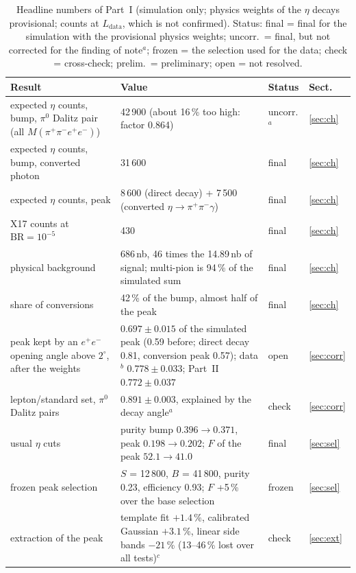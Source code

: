\documentclass[11pt,a4paper]{article}
\newcommand{\piz}{\ensuremath{\pi^{0}}\xspace}
\newcommand{\ee}{\ensuremath{e^{+}e^{-}}\xspace}
\newcommand{\pipi}{\ensuremath{\pi^{+}\pi^{-}}\xspace}
\newcommand{\Mfour}{\ensuremath{M(\pi^{+}\pi^{-}e^{+}e^{-})}\xspace}
\newcommand{\Ldata}{\ensuremath{L_{\mathrm{data}}}\xspace}
\begin{document}
\begin{table}[H]
\centering
\caption{Headline numbers of Part~I (simulation only; physics weights of the $\eta$ decays provisional; counts at
$\Ldata$, which is not confirmed). Status: final = final for the simulation with the provisional physics weights;
uncorr.\ = final, but not corrected for the finding of note$^{a}$; frozen = the selection used for the data;
check = cross-check; prelim.\ = preliminary; open = not resolved.}
\label{tab:sum}
\small
\setlength{\tabcolsep}{4pt}
\begin{tabularx}{\textwidth}{@{}>{\raggedright\arraybackslash}p{4.5cm} L >{\raggedright\arraybackslash}p{1.35cm} >{\raggedright\arraybackslash}p{0.8cm}@{}}
\toprule
Result & Value & Status & Sect. \\
\midrule
expected $\eta$ counts, bump, \piz Dalitz pair (all \Mfour) & 42\,900 (about 16\,\% too high: factor 0.864) & uncorr.$^{a}$ & \ref{sec:ch} \\
expected $\eta$ counts, bump, converted photon & 31\,600 & final & \ref{sec:ch} \\
expected $\eta$ counts, peak & 8\,600 (direct decay) + 7\,500 (converted $\eta\to\pipi\gamma$) & final & \ref{sec:ch} \\
X17 counts at $\mathrm{BR}=10^{-5}$ & 430 & final & \ref{sec:ch} \\
physical background & 686\,nb, 46 times the 14.89\,nb of signal; multi-pion is 94\,\% of the simulated sum & final & \ref{sec:ch} \\
share of conversions & 42\,\% of the bump, almost half of the peak & final & \ref{sec:ch} \\
peak kept by an \ee opening angle above $2^\circ$, after the weights & $0.697\pm0.015$ of the simulated peak (0.59 before; direct decay 0.81, conversion peak 0.57); data$^{b}$ $0.778\pm0.033$; Part~II $0.772\pm0.037$ & open & \ref{sec:corr} \\
lepton/standard set, \piz Dalitz pairs & $0.891\pm0.003$, explained by the decay angle$^{a}$ & check & \ref{sec:corr} \\
usual $\eta$ cuts & purity bump $0.396\to0.371$, peak $0.198\to0.202$; $F$ of the peak $52.1\to41.0$ & final & \ref{sec:sel} \\
frozen peak selection & $S$ = 12\,800, $B$ = 41\,800, purity 0.23, efficiency 0.93; $F$ +5\,\% over the base selection & frozen & \ref{sec:sel} \\
extraction of the peak & template fit $+1.4$\,\%, calibrated Gaussian $+3.1$\,\%, linear side bands $-21$\,\% (13--46\,\% lost over all tests)$^{c}$ & check & \ref{sec:ext} \\

\end{tabularx}
\end{table}
\end{document}
